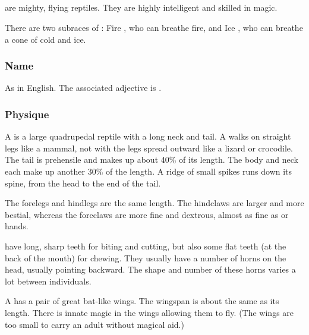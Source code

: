 

\subsection{\Dragon{}}
\label{\Dragon}
\Dragons{} are mighty, flying reptiles. They are highly intelligent and skilled in magic. 

There are two subraces of \dragons{}: Fire \dragons{}, who can breathe fire, and Ice \dragons{}, who can breathe a cone of cold and ice. 

\subsubsection{Name}
As in English. The associated adjective is \emph{\draconic{}}. 

\subsubsection{Physique}
A \dragon{} is a large quadrupedal reptile with a long neck and tail. A \dragon{} walks on straight legs like a mammal, not with the legs spread outward like a lizard or crocodile. The tail is prehensile and makes up about 40\% of its length. The body and neck each make up another 30\% of the length. A ridge of small spikes runs down its spine, from the head to the end of the tail. 

The forelegs and hindlegs are the same length. The hindclaws are larger and more bestial, whereas the foreclaws are more fine and dextrous, almost as fine as \human{} or \scatha{} hands. 

\Dragons{} have long, sharp teeth for biting and cutting, but also some flat teeth (at the back of the mouth) for chewing. They usually have a number of horns on the head, usually pointing backward. The shape and number of these horns varies a lot between individuals. 

A \dragon{} has a pair of great bat-like wings. The \dragonz{} wingspan is about the same as its length. There is innate magic in the wings allowing them to fly. (The wings are too small to carry an adult \dragon{} without magical aid.) 

